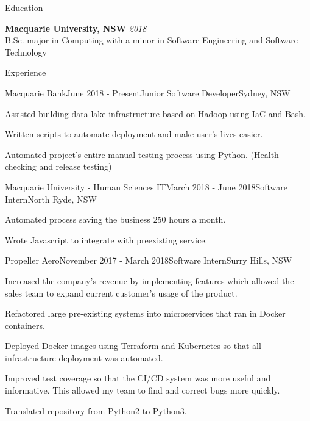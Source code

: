 \documentclass{resume} %
\begin{document}

\begin{rSection}{Education}

{\bf Macquarie University, NSW} \hfill {\em 2018} \\ 
B.Sc. major in Computing with a minor in Software Engineering and Software Technology\\

\end{rSection}


\begin{rSection}{Experience}


\begin{rSubsection}{Macquarie Bank}{June 2018 - Present}{Junior Software Developer}{Sydney, NSW}
\item Assisted building data lake infrastructure based on Hadoop using IaC and Bash.
\item Written scripts to automate deployment and make user's lives easier.
\item Automated project's entire manual testing process using Python. (Health checking and release testing) 
\end{rSubsection}

\begin{rSubsection}{Macquarie University - Human Sciences IT}{March 2018 - June 2018}{Software Intern}{North Ryde, NSW}
\item Automated process saving the business 250 hours a month.
\item Wrote Javascript to integrate with preexisting service.
\end{rSubsection}

\begin{rSubsection}{Propeller Aero}{November 2017 - March 2018}{Software Intern}{Surry Hills, NSW}
\item Increased the company's revenue by implementing features which allowed the sales team to expand current customer's usage of the product.
\item Refactored large pre-existing systems into microservices that ran in Docker containers. 
\item Deployed Docker images using Terraform and Kubernetes so that all infrastructure deployment was automated.
\item Improved test coverage so that the CI/CD system was more useful and informative. This allowed my team to find and correct bugs more quickly.
\item Translated repository from Python2 to Python3.
\end{rSubsection}

\end{rSection}
\end{document}
